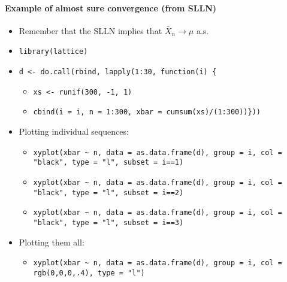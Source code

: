 \paragraph{Example of almost sure convergence (from SLLN)}
\begin{itemize}
\item Remember that the SLLN implies that $\bar X_n \to \mu$ a.s.
\item \texttt{library(lattice)}
\item \texttt{d <- do.call(rbind, lapply(1:30, function(i) \{}
\begin{itemize}
\item \texttt{xs <- runif(300, -1, 1)}
\item \texttt{cbind(i = i, n = 1:300, xbar = cumsum(xs)/(1:300))\}))}
\end{itemize}
\item Plotting individual sequences:
\begin{itemize}
\item \texttt{xyplot(xbar \textasciitilde{} n, data = as.data.frame(d), group = i, col = "black", type = "l", subset = i==1)}
\item \texttt{xyplot(xbar \textasciitilde{} n, data = as.data.frame(d), group = i, col = "black", type = "l", subset = i==2)}
\item \texttt{xyplot(xbar \textasciitilde{} n, data = as.data.frame(d), group = i, col = "black", type = "l", subset = i==3)}
\end{itemize}
\item Plotting them all:
\begin{itemize}
\item \texttt{xyplot(xbar \textasciitilde{} n, data = as.data.frame(d), group = i, col = rgb(0,0,0,.4), type = "l")}
\end{itemize}
\end{itemize}

